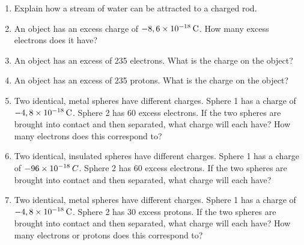 \begin{enumerate}[noitemsep, label=\textbf{\arabic*}. ]
\label{m38781*uid44}\item Explain how a stream of water can be attracted to a charged rod.\newline
            
\item An object has an excess charge of 
\begin{math}-8,6\ensuremath{\times}{10}^{-18}\phantom{\rule{2pt}{0ex}}\mathrm{C}\end{math}. How many excess electrons does it have?\newline
            \item An object has an excess of 235 electrons. What is the charge on the object?\newline
            \item An object has an excess of 235 protons. What is the charge on the object?\newline
            \item Two identical, metal spheres have different charges. Sphere 1 has a charge of 
\begin{math}-4,8\ensuremath{\times}{10}^{-18}\phantom{\rule{2pt}{0ex}}\mathrm{C}\end{math}. Sphere 2 has 60 excess electrons. If the two spheres are brought into contact and then separated, what charge will each have? How many electrons does this correspond to?\newline
            \item Two identical, insulated spheres have different charges. Sphere 1 has a charge of 
\begin{math}-96\ensuremath{\times}{10}^{-18}\phantom{\rule{2pt}{0ex}}C\end{math}. Sphere 2 has 60 excess electrons. If the two spheres are brought into contact and then separated, what charge will each have? \newline
            \item Two identical, metal spheres have different charges. Sphere 1 has a charge of 
\begin{math}-4,8\ensuremath{\times}{10}^{-18}\phantom{\rule{2pt}{0ex}}\mathrm{C}\end{math}. Sphere 2 has 30 excess protons. If the two spheres are brought into contact and then separated, what charge will each have? How many electrons or protons does this correspond to?\newline
            \end{enumerate}
        
    
  \label{m38781**end}
          
